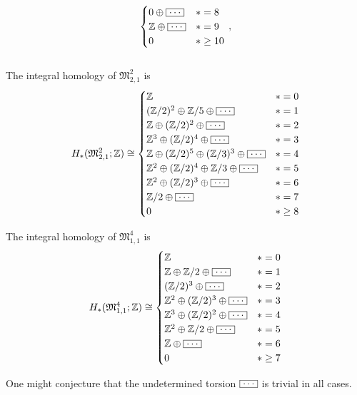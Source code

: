 \begin{thm*}
\[\begin{cases}
                0  \oplus \bldots               & \ast = 8\\
                \mathbb Z  \oplus \bldots       & \ast = 9\\
                0                               & \ast \ge 10\\
            \end{cases}\,,
    \]
    \\[2pt]
    \noindent The integral homology of $\mathfrak M_{2,1}^2$ is
    \[
        H_\ast( \mathfrak{M}_{2,1}^2; \mathbb Z ) \cong 
        \begin{cases}
            \mathbb Z           & \ast = 0\\
            (\mathbb Z/2)^2 \oplus \mathbb Z/5 \oplus \bldots    & \ast = 1\\
            \mathbb Z \oplus (\mathbb Z/2)^2 \oplus \bldots      & \ast = 2\\
            \mathbb Z^3 \oplus (\mathbb Z/2)^4 \oplus \bldots    & \ast = 3\\
            \mathbb Z \oplus (\mathbb Z/2)^5 \oplus (\mathbb Z/3)^3 \oplus \bldots       & \ast = 4\\
            \mathbb Z^2 \oplus (\mathbb Z/2)^4 \oplus \mathbb Z/3 \oplus \bldots         & \ast = 5\\
            \mathbb Z^2 \oplus (\mathbb Z/2)^3 \oplus \bldots    & \ast = 6\\
            \mathbb Z/2 \oplus \bldots                           & \ast = 7\\
            0                   & \ast \ge 8\\
        \end{cases}
    \]
    
    \noindent The integral homology of $\mathfrak M_{1,1}^4$ is
    \[
        H_\ast( \mathfrak{M}_{1,1}^4; \mathbb Z ) \cong 
        \begin{cases}
            \mathbb Z           & \ast = 0\\
            \mathbb Z \oplus \mathbb Z/2 \oplus \bldots          & \ast = 1\\
            (\mathbb Z/2)^3 \oplus \bldots                       & \ast = 2\\
            \mathbb Z^2 \oplus (\mathbb Z/2)^3 \oplus \bldots    & \ast = 3\\
            \mathbb Z^3 \oplus (\mathbb Z/2)^2 \oplus \bldots    & \ast = 4\\
            \mathbb Z^2 \oplus \mathbb Z/2 \oplus \bldots        & \ast = 5\\
            \mathbb Z \oplus \bldots     & \ast = 6\\
            0                           & \ast \ge 7\\
        \end{cases}
    \]
\end{thm*}
One might conjecture that the undetermined torsion $\bldots$ is trivial in all cases.

